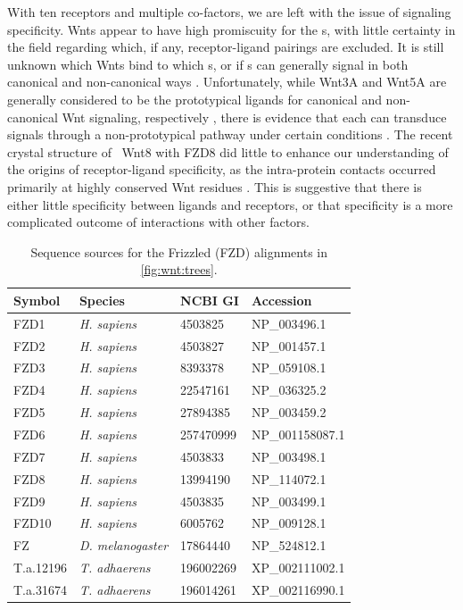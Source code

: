 With ten receptors and multiple co-factors, we are left with the issue of
signaling specificity.
Wnts appear to have high promiscuity for the \fz s, with little
certainty in the field regarding which, if any, receptor-ligand pairings are excluded.
It is still unknown which Wnts bind to
which \fz s, or if \fz s can generally signal in both canonical and non-canonical ways
\cite{Angers2009,VanAmerongen2012}.
Unfortunately, while Wnt3A and Wnt5A are generally
considered to be the prototypical ligands for canonical and non-canonical
Wnt signaling, respectively  \cite{Huang2004}, there is
evidence that each can transduce signals through a non-prototypical pathway
under certain conditions \cite{VanAmerongen2012}.
The recent crystal structure of \frog\ Wnt8 with FZD8
did little to enhance our
understanding of the origins of receptor-ligand specificity,
as the intra-protein contacts occurred primarily at highly conserved
Wnt residues \cite{Janda2012}. This is suggestive that there is either
little specificity between ligands and receptors, or that specificity
is a more complicated outcome of interactions with other factors.




    \begin{table}[!bt]
    \centering
	\footnotesize
    \caption[List of Frizzleds]{ Sequence sources for the 
    Frizzled (FZD) alignments in \autoref{fig:wnt:trees}. }
    \label{table:pathways:methods:frizzled}
    \begin{tabular}{llll}
    \hline
    Symbol & Species & NCBI GI & Accession \\ \hline
	FZD1  & \textit{H. sapiens} & 4503825   & NP\_003496.1    \\ 
	FZD2  & \textit{H. sapiens} & 4503827   & NP\_001457.1    \\ 
	FZD3  & \textit{H. sapiens} & 8393378   & NP\_059108.1    \\ 
	FZD4  & \textit{H. sapiens} & 22547161  & NP\_036325.2    \\ 
	FZD5  & \textit{H. sapiens} & 27894385  & NP\_003459.2    \\ 
	FZD6  & \textit{H. sapiens} & 257470999 & NP\_001158087.1 \\ 
	FZD7  & \textit{H. sapiens} & 4503833   & NP\_003498.1    \\ 
	FZD8  & \textit{H. sapiens} & 13994190  & NP\_114072.1    \\ 
	FZD9  & \textit{H. sapiens} & 4503835   & NP\_003499.1    \\ 
	FZD10 & \textit{H. sapiens} & 6005762   & NP\_009128.1    \\ 
	FZ    & \textit{D. melanogaster}  & 17864440  & NP\_524812.1 \\
	T.a.12196 & \textit{T. adhaerens} & 196002269 & XP\_002111002.1 \\
	T.a.31674 & \textit{T. adhaerens} & 196014261 & XP\_002116990.1 \\
    \hline
    \end{tabular}
    \end{table}

